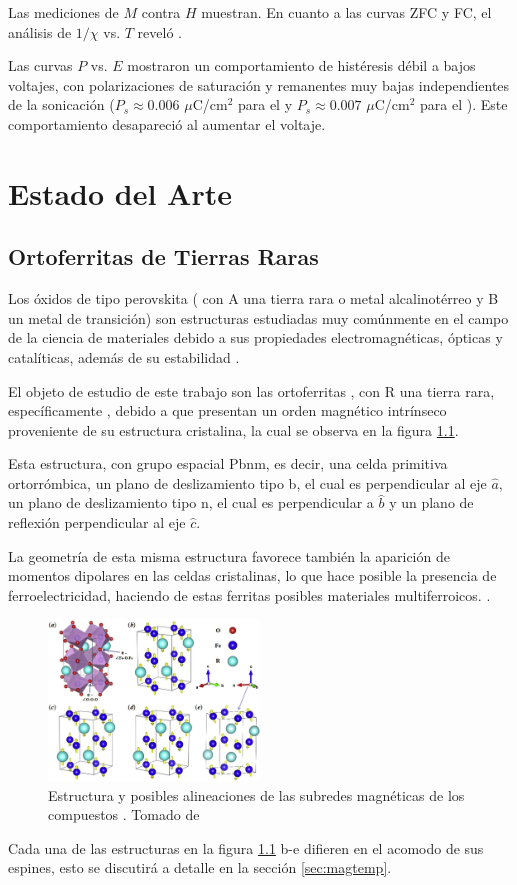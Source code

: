 \documentclass[../main.tex]{subfiles}
\begin{document}
Las mediciones de $M$ contra $H$ muestran. En cuanto a las curvas ZFC y FC, el análisis de $1/\chi$ vs. $T$ reveló .

Las curvas $P$ vs. $E$ mostraron un comportamiento de histéresis débil a bajos voltajes, con polarizaciones de saturación y remanentes muy bajas independientes de la sonicación ($P_s\approx 0.006$ $\mu$C/cm$^2$ para el \neod{} y $P_s\approx 0.007$ $\mu$C/cm$^2$ para el \sama{}). Este comportamiento desapareció al aumentar el voltaje.
\chapter{Estado del Arte}
\section{Ortoferritas de Tierras Raras}
Los óxidos de tipo perovskita ( con A una tierra rara o metal alcalinotérreo y B un metal de transición) son estructuras estudiadas muy comúnmente en el campo de la ciencia de materiales debido a sus propiedades electromagnéticas, ópticas y catalíticas, además de su estabilidad \cite{Wang2019}.

El objeto de estudio de este trabajo son las ortoferritas , con R una tierra rara, específicamente , debido a que presentan un orden magnético intrínseco proveniente de su estructura cristalina, la cual se observa en la figura \ref{fig:estructuras}. 

Esta estructura, con grupo espacial Pbnm, es decir, una celda primitiva ortorrómbica, un plano de deslizamiento tipo b, el cual es perpendicular al eje $\hat{a}$, un plano de deslizamiento tipo n, el cual es perpendicular a $\hat{b}$ y un plano de reflexión perpendicular al eje $\hat{c}$.

La geometría de esta misma estructura favorece también la aparición de momentos dipolares en las celdas cristalinas, lo que hace posible la presencia de ferroelectricidad, haciendo de estas ferritas posibles materiales multiferroicos. \cite{Sharma2024}.
\begin{figure}[H]
    \centering
    \includegraphics[width=0.5\textwidth]{fig/estructura.jpg}
    \caption{Estructura y posibles alineaciones de las subredes magnéticas de los compuestos . Tomado de \cite{Wang2019}}
    \label{fig:estructuras}
\end{figure}
Cada una de las estructuras en la figura \ref{fig:estructuras} b-e difieren en el acomodo de sus espines, esto se discutirá a detalle en la sección \ref{sec:magtemp}.
\end{document}
